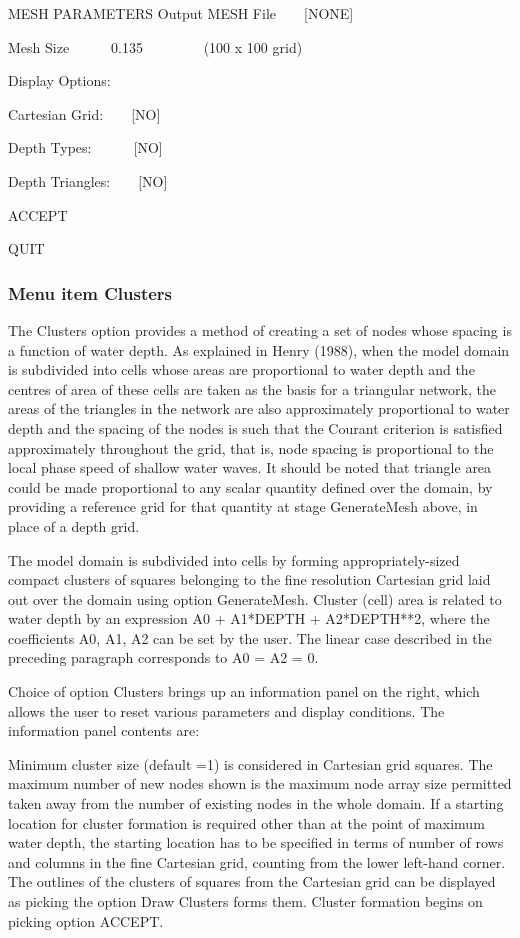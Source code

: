 \documentclass{article}
\begin{document}
\begin{center}

MESH PARAMETERS\newline
Output MESH File\ \ \ \ [NONE]

Mesh Size\ \ \ \ \ \ 0.135\newline
\ \ \ \ \ \ \ \ (100 x 100 grid)

Display Options:

Cartesian Grid:\ \ \ \ [NO]

Depth Types:\ \ \ \ \ \ [NO]

Depth Triangles:\ \ \ \ [NO]

ACCEPT

QUIT

\end{center}
\subsubsection[Menu item Clusters]{Menu item Clusters}
The Clusters option provides a method of creating a set of nodes whose spacing is a function of water depth. As explained in Henry (1988), when the model domain is subdivided into cells whose areas are proportional to water depth and the centres of area of these cells are taken as the basis for a triangular network, the areas of the triangles in the network are also approximately proportional to water depth and the spacing of the nodes is such that the Courant criterion is satisfied approximately throughout the grid, that is, node spacing is proportional to the local phase speed of shallow water waves. It should be noted that triangle area could be made proportional to any scalar quantity defined over the domain, by providing a reference grid for that quantity at stage GenerateMesh above, in place of a depth grid.

The model domain is subdivided into cells by forming appropriately-sized compact clusters of squares belonging to the fine resolution Cartesian grid laid out over the domain using option GenerateMesh. Cluster (cell) area is related to water depth by an expression A0 + A1*DEPTH + A2*DEPTH**2, where the coefficients A0, A1, A2 can be set by the user. The linear case described in the preceding paragraph corresponds to A0 = A2 = 0.

Choice of option Clusters brings up an information panel on the right, which allows the user to reset various parameters and display conditions. The information panel contents are:

Minimum cluster size (default =1) is considered in Cartesian grid squares. The maximum number of new nodes shown is the maximum node array size permitted taken away from the number of existing nodes in the whole domain. If a starting location for cluster formation is required other than at the point of maximum water depth, the starting location has to be specified in terms of number of rows and columns in the fine Cartesian grid, counting from the lower left-hand corner. The outlines of the clusters of squares from the Cartesian grid can be displayed as picking the option Draw Clusters forms them. Cluster formation begins on picking option ACCEPT.
\end{document}
